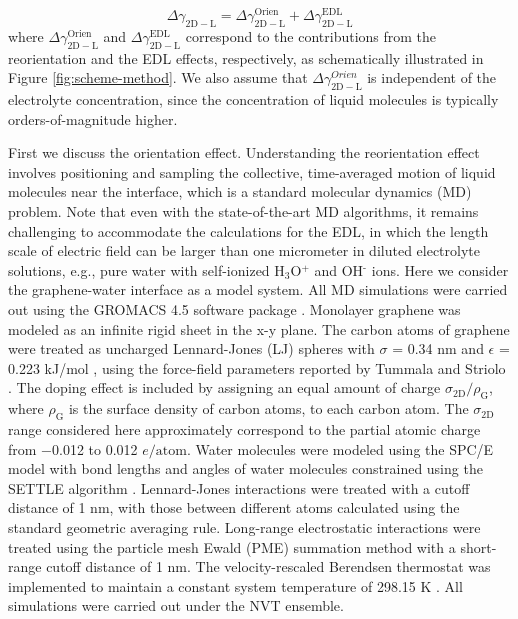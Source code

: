 \documentclass[journal=jacsat,manuscript=article,email=true]{achemso}
\begin{document}
\begin{equation}
\label{eqn-delta-gamma-decompose}
\Delta \gamma_{\mathrm{2D-L}} = \Delta \gamma_{\mathrm{2D-L}}^{\mathrm{Orien}}
                              + \Delta \gamma_{\mathrm{2D-L}}^{\mathrm{EDL}}
\end{equation}
where \(\Delta \gamma_{\mathrm{2D-L}}^{\mathrm{Orien}}\) and \(\Delta
\gamma_{\mathrm{2D-L}}^{\mathrm{EDL}}\) correspond to the contributions
from the reorientation and the EDL effects, respectively, as
schematically illustrated in Figure \ref{fig:scheme-method}. We also
assume that \(\Delta \gamma_{\mathrm{2D-L}}^{Orien}\) is independent of
the electrolyte concentration, since the concentration of liquid
molecules is typically orders-of-magnitude higher.


First we discuss the orientation effect. Understanding the
reorientation effect involves positioning and sampling the collective,
time-averaged motion of liquid molecules near the interface, which is
a standard molecular dynamics (MD) problem. Note that even with the
state-of-the-art MD algorithms, it remains challenging to accommodate
the calculations for the EDL, in which the length scale of electric
field can be larger than one micrometer in diluted electrolyte
solutions, e.g., pure water with self-ionized H\(_{\text{3}}\)O\(^{\text{+}}\) and OH\(^{\text{-}}\)
ions. Here we consider the graphene-water interface as a model
system. All MD simulations were carried out using the GROMACS 4.5
software package \cite{Hess_2008}. Monolayer graphene was modeled as an
infinite rigid sheet in the x-y plane. The carbon atoms of graphene
were treated as uncharged Lennard-Jones (LJ) spheres with \(\sigma\) =
0.34 nm and \(\epsilon\) = 0.223 kJ/mol \cite{Cheng_1990}, using the
force-field parameters reported by Tummala and Striolo
\cite{Tummala_2008}. The doping effect is included by assigning an equal
amount of charge \(\sigma_{\mathrm{2D}} / \rho_{\mathrm{G}}\), where
\(\rho_{\mathrm{G}}\) is the surface density of carbon atoms, to each
carbon atom. The \(\sigma_{\mathrm{2D}}\) range considered here
approximately correspond to the partial atomic charge from −0.012 to
0.012 \(e/\mathrm{atom}\). Water molecules were modeled using the SPC/E
model \cite{Berendsen_1987} with bond lengths and angles of water
molecules constrained using the SETTLE algorithm
\cite{Miyamoto_1992}. Lennard-Jones interactions were treated with a
cutoff distance of 1 nm, with those between different atoms calculated
using the standard geometric averaging rule. Long-range electrostatic
interactions were treated using the particle mesh Ewald (PME)
summation method \cite{Darden_1993,Essmann_1995} with a short-range
cutoff distance of 1 nm. The velocity-rescaled Berendsen thermostat
was implemented to maintain a constant system temperature of 298.15 K
\cite{Bussi_2007}. All simulations were carried out under the NVT
ensemble.
\end{document}
